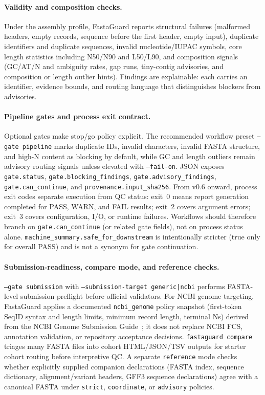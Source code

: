 \documentclass[11pt,a4paper]{article}
\begin{document}
\paragraph{Validity and composition checks.}
Under the assembly profile, FastaGuard reports structural failures (malformed
headers, empty records, sequence before the first header, empty input),
duplicate identifiers and duplicate sequences, invalid nucleotide/IUPAC
symbols, core length statistics including N50/N90 and L50/L90, and composition
signals (GC/AT/N and ambiguity rates, gap runs, tiny-contig advisories, and
composition or length outlier hints).
Findings are explainable: each carries an identifier, evidence bounds, and
routing language that distinguishes blockers from advisories.

\paragraph{Pipeline gates and process exit contract.}
Optional gates make stop/go policy explicit.
The recommended workflow preset \texttt{--gate pipeline} marks duplicate IDs,
invalid characters, invalid FASTA structure, and high-N content as blocking by
default, while GC and length outliers remain advisory routing signals unless
elevated with \texttt{--fail-on}.
JSON exposes \texttt{gate.status}, \texttt{gate.blocking\_findings},
\texttt{gate.advisory\_findings}, \texttt{gate.can\_continue}, and
\texttt{provenance.input\_sha256}.
From v0.6 onward, process exit codes separate execution from QC status:
exit~0 means report generation completed for PASS, WARN, and FAIL results;
exit~2 covers argument errors; exit~3 covers configuration, I/O, or runtime
failures.
Workflows should therefore branch on \texttt{gate.can\_continue} (or related
gate fields), not on process status alone.
\texttt{machine\_summary.safe\_for\_downstream} is intentionally stricter (true
only for overall PASS) and is not a synonym for gate continuation.

\paragraph{Submission-readiness, compare mode, and reference checks.}
\texttt{--gate submission} with \texttt{--submission-target generic|ncbi}
performs FASTA-level submission preflight before official validators.
For NCBI genome targeting, FastaGuard applies a documented
\texttt{ncbi\_genome} policy snapshot (first-token SeqID syntax and length
limits, minimum record length, terminal Ns) derived from the NCBI Genome
Submission Guide~\citep{ncbi_genome_submit}; it does not replace NCBI FCS,
annotation validation, or repository acceptance decisions.
\texttt{fastaguard compare} triages many FASTA files into cohort HTML/JSON/TSV
outputs for starter cohort routing before interpretive QC.
A separate \texttt{reference} mode checks whether explicitly supplied companion
declarations (FASTA index, sequence dictionary, alignment/variant headers,
GFF3 sequence declarations) agree with a canonical FASTA under
\texttt{strict}, \texttt{coordinate}, or \texttt{advisory} policies.
\end{document}
